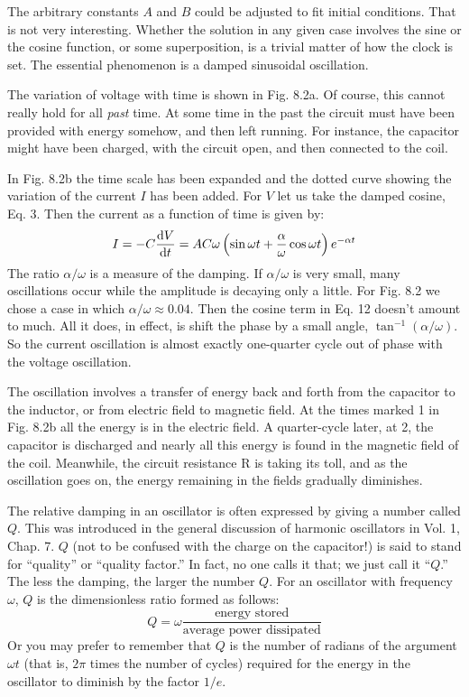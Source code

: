 The arbitrary constants $A$ and $B$ could be adjusted to fit initial
conditions. That is not very interesting. Whether the solution in
any given case involves the sine or the cosine function, or some 
superposition, is a trivial matter of how the clock is set. The essential
phenomenon is a damped sinusoidal oscillation.


The variation of voltage with time is shown in Fig. 8.2a. Of course,
this cannot really hold for all \emph{past} time. At some time in the past
the circuit must have been provided with energy somehow, and then
left running. For instance, the capacitor might have been charged,
with the circuit open, and then connected to the coil.

In Fig. 8.2b the time scale has been expanded and the dotted curve
showing the variation of the current $I$ has been added. For $V$ let us
take the damped cosine, Eq. 3. Then the current as a function of time
is given by:
\begin{equation}
  I = -C\frac{\textup{d} V}{\textup{d} t} = AC\omega\left(\sin\omega t+\frac{\alpha}{\omega}\cos\omega t\right)e^{-\alpha t}
\end{equation}
The ratio $\alpha/\omega$ is a measure of the damping. If $\alpha/\omega$ is very small,
many oscillations occur while the amplitude is decaying only a little.
For Fig. 8.2 we chose a case in which $\alpha/\omega\approx 0.04$. Then the cosine
term in Eq. 12 doesn't amount to much. All it does, in effect, is shift
the phase by a small angle, $\tan^{-1}(\alpha/\omega)$. So the current oscillation
is almost exactly one-quarter cycle out of phase with the voltage
oscillation.

The oscillation involves a transfer of energy back and forth from
the capacitor to the inductor, or from electric field to magnetic field.
At the times marked 1 in Fig. 8.2b all the energy is in the electric field.
A quarter-cycle later, at 2, the capacitor is discharged and nearly all
this energy is found in the magnetic field of the coil. Meanwhile, the
circuit resistance R is taking its toll, and as the oscillation goes on,
the energy remaining in the fields gradually diminishes.

The relative damping in an oscillator is often expressed by giving a
number called $Q$.
This was introduced in the general discussion of
harmonic oscillators in Vol. 1, Chap. 7. $Q$ (not to be confused with
the charge on the capacitor!) is said to stand for ``quality'' or ``quality
factor.'' In fact, no one calls it that; we just call it ``$Q$.'' The less
the damping, the larger the number $Q$. For an oscillator with frequency
$\omega$, $Q$ is the dimensionless ratio formed as follows:
\begin{equation}
  Q = \omega\frac{\text{energy stored}}{\text{average power dissipated}}
\end{equation}
Or you may prefer to remember that $Q$ is the number of radians of
the argument $\omega t$ (that is, $2\pi$ times the number of cycles) required for
the energy in the oscillator to diminish by the factor $1/e$.

